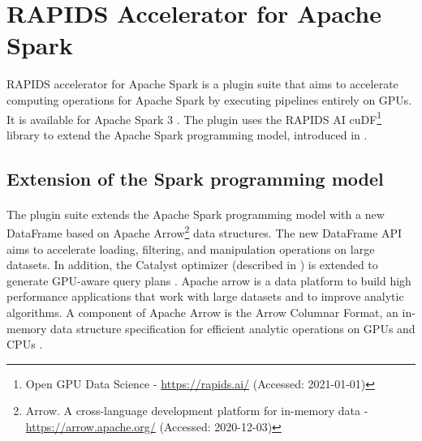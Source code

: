 \section{RAPIDS Accelerator for Apache Spark}
\label{sec:04_rapids}
RAPIDS accelerator for Apache Spark is a plugin suite that aims to accelerate computing operations for Apache Spark by executing pipelines entirely on GPUs. It is available for Apache Spark 3 \cite{SparkRapids2020Docs}.
The plugin uses the RAPIDS AI cuDF\footnote{Open GPU Data Science - \url{https://rapids.ai/} (Accessed: 2021-01-01)} library to extend the Apache Spark programming model, introduced in  \cite{SparkRapids2020Docs, Mcdonald2020SparkRapids, Aguerzame2019GPUAO}.


\subsection{Extension of the Spark programming model}
\label{subsec:04_rapids_ext}
\paragraph{}The plugin suite extends the Apache Spark programming model with a new DataFrame based on Apache Arrow\footnote{Arrow. A cross-language development platform for in-memory data - \url{https://arrow.apache.org/} (Accessed: 2020-12-03)} data structures. The new DataFrame API aims to accelerate loading, filtering, and manipulation operations on large datasets. In addition, the Catalyst optimizer (described in ) is extended to generate GPU-aware query plans \cite{Mcdonald2020SparkRapids, Aguerzame2019GPUAO}.
Apache arrow is a data platform to build high performance applications that work with large datasets and to improve analytic algorithms. A component of Apache Arrow is the Arrow Columnar Format, an in-memory data structure specification for efficient analytic operations on GPUs and CPUs \cite{ApacheArrow2020Docs}.


